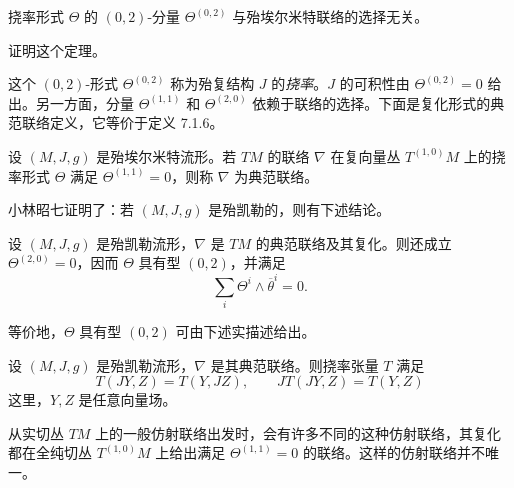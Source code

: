 \begin{theorem}\label{thm:torsion-zero-two-independent}
挠率形式 $\Theta$ 的 $(0,2)$-分量 $\Theta^{(0,2)}$ 与殆埃尔米特联络的选择无关。
\end{theorem}

\begin{exercise}\label{ex:torsion-zero-two-independent}
证明这个定理。
\end{exercise}

这个 $(0,2)$-形式 $\Theta^{(0,2)}$ 称为殆复结构 $J$ 的\emph{挠率}。$J$ 的可积性由 $\Theta^{(0,2)}=0$ 给出。另一方面，分量 $\Theta^{(1,1)}$ 和 $\Theta^{(2,0)}$ 依赖于联络的选择。下面是复化形式的典范联络定义，它等价于定义 7.1.6。

\begin{definition}\label{def:canonical-connection-complexified}
设 $(M,J,g)$ 是殆埃尔米特流形。若 $TM$ 的联络 $\nabla$ 在复向量丛 $T^{(1,0)}M$ 上的挠率形式 $\Theta$ 满足 $\Theta^{(1,1)}=0$，则称 $\nabla$ 为典范联络。
\end{definition}

小林昭七证明了：若 $(M,J,g)$ 是殆凯勒的，则有下述结论。

\begin{theorem}[小林昭七，(Ko03)]\label{thm:almost-kahler-torsion-zero-two}
设 $(M,J,g)$ 是殆凯勒流形，$\nabla$ 是 $TM$ 的典范联络及其复化。则还成立 $\Theta^{(2,0)}=0$，因而 $\Theta$ 具有型 $(0,2)$，并满足
\begin{equation}
 \sum_i\Theta^i\wedge\overline\theta^i=0.
 \label{eq:torsion-cyclic-symmetry}
\end{equation}
\end{theorem}

等价地，$\Theta$ 具有型 $(0,2)$ 可由下述实描述给出。

\begin{proposition}\label{prop:canonical-torsion-real-identities}
设 $(M,J,g)$ 是殆凯勒流形，$\nabla$ 是其典范联络。则挠率张量 $T$ 满足
\[
 T(JY,Z)=T(Y,JZ),\qquad JT(JY,Z)=T(Y,Z)
\]
这里，$Y,Z$ 是任意向量场。
\end{proposition}

\begin{remark}\label{rem:canonical-connection-real-nonunique}
从实切丛 $TM$ 上的一般仿射联络出发时，会有许多不同的这种仿射联络，其复化都在全纯切丛 $T^{(1,0)}M$ 上给出满足 $\Theta^{(1,1)}=0$ 的联络。这样的仿射联络并不唯一。
\end{remark}

